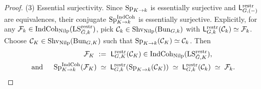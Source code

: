 \begin{proof}
(3) Essential surjectivity. Since \(\operatorname{Sp}_{K\to k}\) is essentially surjective and \(\mathsf L^{\mathrm{restr}}_{G,(-)}\) are equivalences, their conjugate \(\operatorname{Sp}^{\mathrm{IndCoh}}_{K\to k}\) is essentially surjective. Explicitly, for any \(\mathcal{F}_k\in\mathrm{IndCoh}_{\mathrm{Nilp}}(\mathrm{LS}^{\mathrm{restr}}_{\breve G,k})\), pick \(\mathcal{C}_k\in\mathrm{Shv}_{\mathrm{Nilp}}(\mathrm{Bun}_{G,k})\) with \(\mathsf L^{\mathrm{restr}}_{G,k}(\mathcal{C}_k)\simeq\mathcal{F}_k\). Choose \(\mathcal{C}_K\in\mathrm{Shv}_{\mathrm{Nilp}}(\mathrm{Bun}_{G,K})\) such that \(\operatorname{Sp}_{K\to k}(\mathcal{C}_K)\simeq\mathcal{C}_k\). Then
\[
\begin{aligned}
\mathcal{F}_K\ &:=\ \mathsf L^{\mathrm{restr}}_{G,K}(\mathcal{C}_K)\in\mathrm{IndCoh}_{\mathrm{Nilp}}(\mathrm{LS}^{\mathrm{restr}}_{\breve G,K}),\\
\text{and }\quad \operatorname{Sp}^{\mathrm{IndCoh}}_{K\to k}(\mathcal{F}_K)
&\;\simeq\;\mathsf L^{\mathrm{restr}}_{G,k}(\operatorname{Sp}_{K\to k}(\mathcal{C}_K))
\;\simeq\;\mathsf L^{\mathrm{restr}}_{G,k}(\mathcal{C}_k)
\;\simeq\;\mathcal{F}_k.\qedhere
\end{aligned}
\]
\end{proof}
